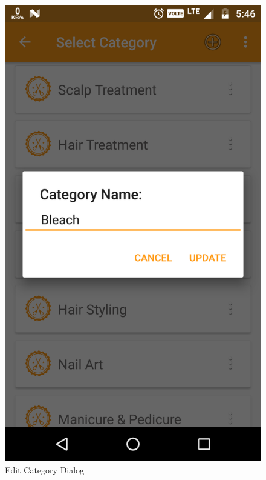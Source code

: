 \\
\begin{figure}[h]
	\centering
	\includegraphics[width=0.7\linewidth]{EditCategory}
	\caption{Edit Category Dialog}
\end{figure}
\pagebreak

